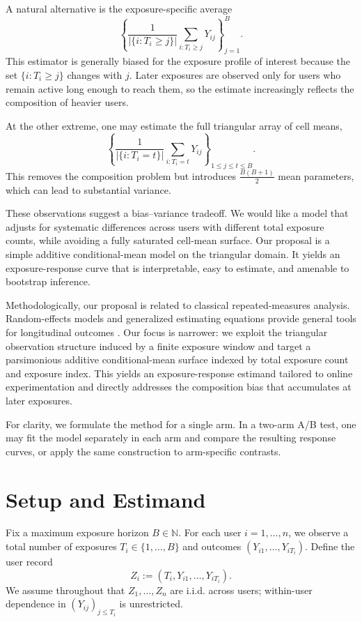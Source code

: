 \documentclass[sigconf,anonymous,review]{acmart}
\begin{document}
A natural alternative is the exposure-specific average
\[
\left\{
\frac{1}{|\{i:T_i\ge j\}|}
\sum_{i:T_i\ge j} Y_{ij}
\right\}_{j=1}^B.
\]
This estimator is generally biased for the exposure profile of interest because the set $\{i:T_i\ge j\}$ changes with $j$. Later exposures are observed only for users who remain active long enough to reach them, so the estimate increasingly reflects the composition of heavier users.

At the other extreme, one may estimate the full triangular array of cell means,
\[
\left\{
\frac{1}{|\{i:T_i=t\}|}
\sum_{i:T_i=t} Y_{ij}
\right\}_{1\le j\le t\le B}.
\]
This removes the composition problem but introduces $\frac{B(B+1)}{2}$ mean parameters, which can lead to substantial variance.

These observations suggest a bias--variance tradeoff. We would like a model that adjusts for systematic differences across users with different total exposure counts, while avoiding a fully saturated cell-mean surface. Our proposal is a simple additive conditional-mean model on the triangular domain. It yields an exposure-response curve that is interpretable, easy to estimate, and amenable to bootstrap inference.

Methodologically, our proposal is related to classical repeated-measures analysis. Random-effects models and generalized estimating equations provide general tools for longitudinal outcomes \cite{LairdWare1982,LiangZeger1986}. Our focus is narrower: we exploit the triangular observation structure induced by a finite exposure window and target a parsimonious additive conditional-mean surface indexed by total exposure count and exposure index. This yields an exposure-response estimand tailored to online experimentation and directly addresses the composition bias that accumulates at later exposures.

For clarity, we formulate the method for a single arm. In a two-arm A/B test, one may fit the model separately in each arm and compare the resulting response curves, or apply the same construction to arm-specific contrasts.

\section{Setup and Estimand}

Fix a maximum exposure horizon $B\in\mathbb{N}$. For each user $i=1,\dots,n$, we observe a total number of exposures $T_i\in\{1,\dots,B\}$ and outcomes $(Y_{i1},\dots,Y_{iT_i})$. Define the user record
\[
Z_i := (T_i, Y_{i1},\dots,Y_{iT_i}).
\]
We assume throughout that $Z_1,\dots,Z_n$ are i.i.d. across users; within-user dependence in $(Y_{ij})_{j\le T_i}$ is unrestricted.
\end{document}
